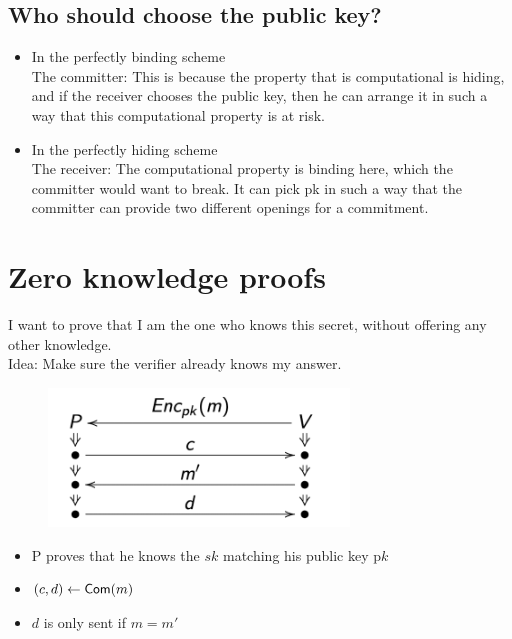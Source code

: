 \documentclass[12pt]{article}
\begin{document}
\subsection{Who should choose the public key?}
\begin{itemize}
\item In the perfectly binding scheme\\
The committer: This is because the property that is computational is hiding, and if the receiver chooses the public key, then he can arrange it in such a way that this computational property is at risk. 
\item In the perfectly hiding scheme\\
The receiver: The computational property is binding here, which the committer would  want to break. It can pick pk in such a way that the committer can provide two different openings for a commitment.
\end{itemize}


\section{Zero knowledge proofs}
I want to prove that I am the one who knows this secret, without offering any other knowledge. \\
Idea: Make sure the verifier already knows my answer.
\begin{figure}[ht]
    \centering
    \includegraphics[width=8cm]{figures/f1.png}
\end{figure}
\begin{itemize}
\item P proves that he knows the $sk$ matching his public key p$k$
\item $(c,d) \leftarrow \operatorname{\mathsf{Com}}(m)$
\item $d$ is only sent if $m=m'$
\end{itemize}
\end{document}
